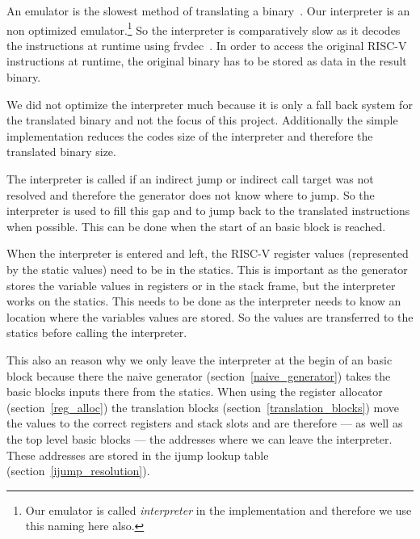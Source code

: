 \documentclass[course=eragp]{aspdoc}
\begin{document}
An emulator is the slowest method of translating a binary~\cite{binary_translation}. Our interpreter
is an non optimized emulator.\footnote{Our emulator is called \textit{interpreter} in the implementation
    and therefore we use this naming here also.} So the interpreter is comparatively slow as it decodes the
instructions at runtime using frvdec~\cite{frvdec}. In order to access the original RISC-V
instructions at runtime, the original binary has to be stored as data in the result binary.

\par

We did not optimize the interpreter much because it is only a fall back system for the translated
binary and not the focus of this project. Additionally the simple implementation reduces the codes
size of the interpreter and therefore the translated binary size.

\par

The interpreter is called if an indirect jump or indirect call target was not resolved and therefore
the generator does not know where to jump. So the interpreter is used to fill this gap and to jump
back to the translated instructions when possible. This can be done when the start of an basic block
is reached.

\par

When the interpreter is entered and left, the RISC-V register values (represented by the static
values) need to be in the statics. This is important as the generator stores the variable values in
registers or in the stack frame, but the interpreter works on the statics. This needs to be done as
the interpreter needs to know an location where the variables values are stored. So the values are
transferred to the statics before calling the interpreter.

\par

This also an reason why we only leave the interpreter at the begin of an basic block because there
the naive generator (section~\ref{naive_generator}) takes the basic blocks inputs there from the statics.
When using the register allocator (section~\ref{reg_alloc}) the translation blocks
(section~\ref{translation_blocks}) move the values to the correct registers and stack slots and are
therefore --- as well as the top level basic blocks --- the addresses where we can leave the
interpreter. These addresses are stored in the ijump lookup table (section~\ref{ijump_resolution}).
\end{document}
